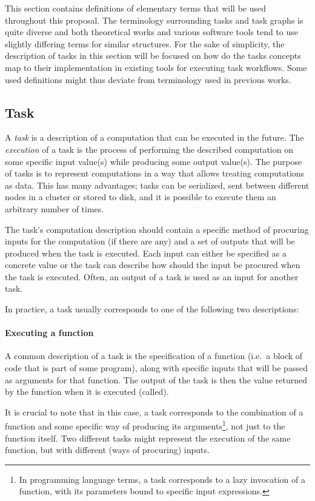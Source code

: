 This section contains definitions of elementary terms that will be used throughout this proposal.
The terminology surrounding tasks and task graphs is quite diverse and both theoretical works
and various software tools tend to use slightly differing terms for similar structures. For the
sake of simplicity, the description of tasks in this section will be focused on how do the tasks
concepts map to their implementation in existing tools for executing task workflows. Some used
definitions might thus deviate from terminology used in previous works.

\subsection{Task}
A \emph{task} is a description of a computation that can be executed in the future. The
\textit{execution} of a task is the process of performing the described computation on some
specific input value(s) while producing some output value(s). The purpose of tasks is to represent
computations in a way that allows treating computations as data. This has many advantages; tasks
can be serialized, sent between different nodes in a cluster or stored to disk, and it is possible
to execute them an arbitrary number of times.

The task's computation description should contain a specific method of procuring inputs
for the computation (if there are any) and a set of outputs that will be produced when the task
is executed. Each input can either be specified as a concrete value or the task can describe how
should the input be procured when the task is executed. Often, an output of a task is used as
an input for another task.

In practice, a task usually corresponds to one of the following two descriptions:

\paragraph{Executing a function} A common description of a task is the specification of a
function (i.e.\ a block of code that is part of some program), along with specific inputs that will
be passed as arguments for that function. The output of the task is then the value returned by the
function when it is executed (called).

It is crucial to note that in this case, a task corresponds to the combination of a function and
some specific way of producing its arguments\footnote{In programming language terms, a task
corresponds to a lazy invocation of a function, with its parameters bound to specific input
expressions.}, not just to the function itself. Two different tasks might represent the
execution of the same function, but with different (ways of procuring) inputs.

